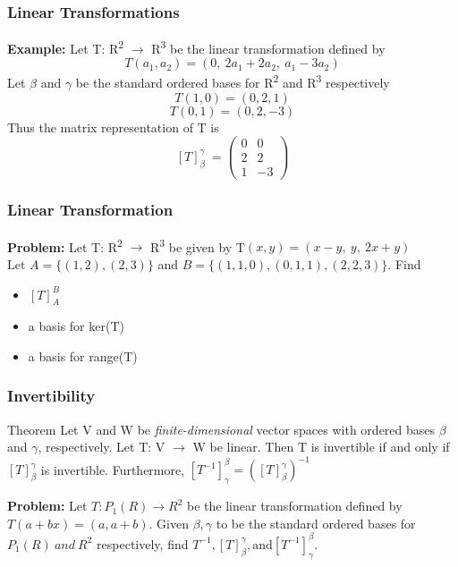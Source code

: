 \documentclass[11pt]{beamer}
\begin{document}
\begin{frame}
	\frametitle{Linear Transformations}
	\textbf{Example: } Let T: R\textsuperscript{2} $\rightarrow$ R\textsuperscript{3} be the linear transformation defined by
	\[ T(a_{1}, a_{2}) = (0,\ 2a_{1} + 2a_{2},\ a_{1} - 3a_{2})\]
	Let $\beta$ and $\gamma$ be the standard ordered bases for R\textsuperscript{2} and R\textsuperscript{3} respectively
	\[ T(1,0) = (0,2,1)\]
	\[ T(0,1) = (0, 2, -3)\]
	Thus the matrix representation of T is
	\[ \left[T \right]_{\beta}^{\gamma}\ = \begin{pmatrix}
		0 & 0 \\
		2 & 2 \\
		1 & -3
	\end{pmatrix}\] 
\end{frame}

\begin{frame}
	\frametitle{Linear Transformation}
	\textbf{Problem: }Let T: R\textsuperscript{2} $\rightarrow$ R\textsuperscript{3} be given by T$(x,y) = (x-y,\ y,\ 2x+y)$ 
	$\text{Let } A = \{ (1,2), (2,3)\} $ and $B = \{(1,1,0), (0,1,1), (2,2,3) \}$. Find 
	\begin{itemize}
		\item 	$\left[T \right]_{A}^{B}$
		\item a basis for ker(T)
		\item a basis for range(T)
	\end{itemize}

\end{frame}

\begin{frame}
	\frametitle{Invertibility}
	\begin{block}{Theorem}
		Let V and W be \textit{finite-dimensional} vector spaces with ordered bases $\beta$ and $\gamma$, respectively. Let T: V $\rightarrow$ W be linear. Then T is invertible if and only if $\left[T\right]_{\beta}^{\gamma}$ is invertible. Furthermore, $\left[T^{-1}\right]_{\gamma}^{\beta} = (\left[ T\right]_{\beta}^{\gamma})^{-1}$
	\end{block}

	\phantom{}
	
	\textbf{Problem:} Let $T: P_{1}(R) \rightarrow R^{2}$ be the linear transformation defined by $T(a + bx) = (a, a+b)$. Given $\beta, \gamma$ to be the standard ordered bases for $P_{1}(R) \ and \ R^{2}$ respectively, find $T^{-1}, \left[ T\right]_{\beta}^{\gamma}, \text{and} \left[ T^{-1} \right]_{\gamma}^{\beta}$.
\end{frame}
\end{document}
